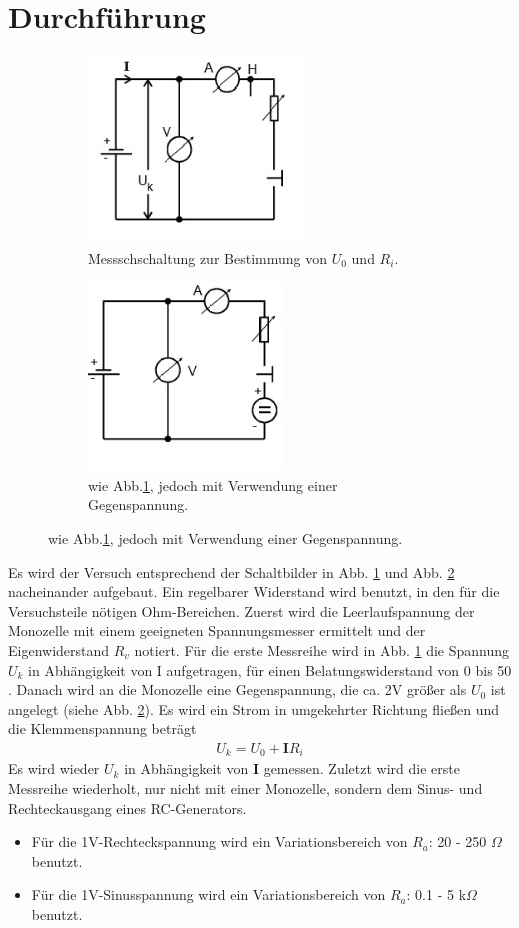 \section{Durchführung}
\label{sec:Durchführung}
\begin{figure}
  \centering
  \begin{subfigure}{0.48\textwidth}
    \centering
    \includegraphics[height=5cm]{data/abb2.jpg}
    \caption{Messschschaltung zur Bestimmung von $U_0$ und $R_i$. \cite{V301}}
    \label{fig:abb2}
  \end{subfigure}
  \begin{subfigure}{0.48\textwidth}
    \centering
    \includegraphics[height=5cm]{data/abb3.jpg}
    \caption{wie Abb.\ref{fig:abb2}, jedoch mit Verwendung einer Gegenspannung. \cite{V301}}
    \label{fig:abb3}
  \end{subfigure}
  \label{fig:Phasen}
\end{figure}
Es wird der Versuch entsprechend der Schaltbilder in Abb. \ref{fig:abb2} und Abb. \ref{fig:abb3} nacheinander aufgebaut.
Ein regelbarer Widerstand wird benutzt, in den für die Versuchsteile nötigen Ohm-Bereichen.
Zuerst wird die Leerlaufspannung der Monozelle mit einem geeigneten Spannungsmesser ermittelt und der Eigenwiderstand $R_v$ notiert.
Für die erste Messreihe wird in Abb. \ref{fig:abb2} die Spannung $U_k$ in Abhängigkeit von I aufgetragen, für einen Belatungswiderstand von 0 bis 50 \Omega .
Danach wird an die Monozelle eine Gegenspannung, die ca. 2V größer als $U_0$ ist angelegt (siehe Abb. \ref{fig:abb3}).
Es wird ein Strom in umgekehrter Richtung fließen und die Klemmenspannung beträgt
\begin{align}
  U_k = U_0 + \symbf{I} R_i
\end{align}
Es wird wieder $U_k$ in Abhängigkeit von $\symbf{I}$ gemessen.
Zuletzt wird die erste Messreihe wiederholt, nur nicht mit einer Monozelle, sondern dem Sinus- und Rechteckausgang eines RC-Generators.
\begin{itemize}
  \item Für die 1V-Rechteckspannung wird ein Variationsbereich von $R_a$: 20 - 250 $\Omega$ benutzt.
  \item Für die 1V-Sinusspannung wird ein Variationsbereich von $R_a$: 0.1 - 5 k$\Omega$ benutzt.
\end{itemize}

